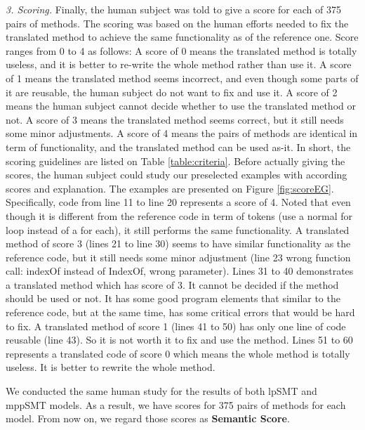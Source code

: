 \emph{3. Scoring.} Finally, the human subject was told to give a score for each of 375 pairs of methods. The scoring was based on the human efforts needed to fix the translated method to achieve the same functionality as of the reference one. Score ranges from 0 to 4 as follows: A score of 0 means the translated method is totally useless, and it is better to re-write the whole method rather than use it. A score of 1 means the translated method seems incorrect, and even though some parts of it are reusable, the human subject do not want to fix and use it. A score of 2 means the human subject cannot decide whether to use the translated method or not. A score of 3 means the translated method seems correct, but it still needs some minor adjustments. A score of 4 means the pairs of methods are identical in term of functionality, and the translated method can be used as-it. In short, the scoring guidelines are listed on Table \ref{table:criteria}. Before actually giving the scores, the human subject could study our preselected examples with according scores and explanation. The examples are presented on Figure \ref{fig:scoreEG}. Specifically, code from line 11 to line 20 represents a score of 4. Noted that even though it is different from the reference code in term of tokens (use a normal for loop instead of a for each), it still performs the same functionality. A translated method of score 3 (lines 21 to line 30) seems to have similar functionality as the reference code, but it still needs some minor adjustment (line 23 wrong function call: indexOf instead of IndexOf, wrong parameter). Lines 31 to 40 demonstrates a translated method which has score of 3. It cannot be decided if the method should be used or not. It has some good program elements that similar to the reference code, but at the same time, has some critical errors that would be hard to fix. A translated method of score 1 (lines 41 to 50) has only one line of code reusable (line 43). So it is not worth it to fix and use the method. Lines 51 to 60 represents a translated code of score 0 which means the whole method is totally useless. It is better to rewrite the whole method. 

We conducted the same human study for the results of both lpSMT and mppSMT models. As a result, we have scores for 375 pairs of methods for each model. From now on, we regard those scores as \textbf{Semantic Score}.

